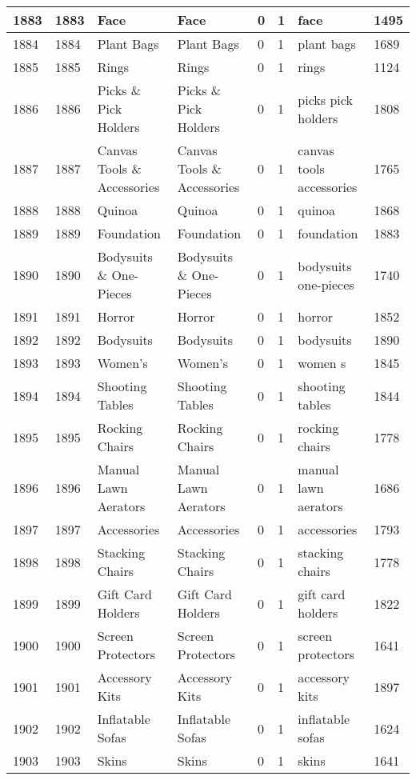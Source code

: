 \begin{longtable}{|l|l|l|l|l|l|l|l|}
1883 & 1883 & Face & Face & 0 & 1 & face & 1495 \\ \hline 
1884 & 1884 & Plant Bags & Plant Bags & 0 & 1 & plant bags & 1689 \\ \hline 
1885 & 1885 & Rings & Rings & 0 & 1 & rings & 1124 \\ \hline 
1886 & 1886 & Picks \& Pick Holders & Picks \& Pick Holders & 0 & 1 & picks pick holders & 1808 \\ \hline 
1887 & 1887 & Canvas Tools \& Accessories & Canvas Tools \& Accessories & 0 & 1 & canvas tools accessories & 1765 \\ \hline 
1888 & 1888 & Quinoa & Quinoa & 0 & 1 & quinoa & 1868 \\ \hline 
1889 & 1889 & Foundation & Foundation & 0 & 1 & foundation & 1883 \\ \hline 
1890 & 1890 & Bodysuits \& One-Pieces & Bodysuits \& One-Pieces & 0 & 1 & bodysuits one-pieces & 1740 \\ \hline 
1891 & 1891 & Horror & Horror & 0 & 1 & horror & 1852 \\ \hline 
1892 & 1892 & Bodysuits & Bodysuits & 0 & 1 & bodysuits & 1890 \\ \hline 
1893 & 1893 & Women's & Women's & 0 & 1 & women s & 1845 \\ \hline 
1894 & 1894 & Shooting Tables & Shooting Tables & 0 & 1 & shooting tables & 1844 \\ \hline 
1895 & 1895 & Rocking Chairs & Rocking Chairs & 0 & 1 & rocking chairs & 1778 \\ \hline 
1896 & 1896 & Manual Lawn Aerators & Manual Lawn Aerators & 0 & 1 & manual lawn aerators & 1686 \\ \hline 
1897 & 1897 & Accessories & Accessories & 0 & 1 & accessories & 1793 \\ \hline 
1898 & 1898 & Stacking Chairs & Stacking Chairs & 0 & 1 & stacking chairs & 1778 \\ \hline 
1899 & 1899 & Gift Card Holders & Gift Card Holders & 0 & 1 & gift card holders & 1822 \\ \hline 
1900 & 1900 & Screen Protectors & Screen Protectors & 0 & 1 & screen protectors & 1641 \\ \hline 
1901 & 1901 & Accessory Kits & Accessory Kits & 0 & 1 & accessory kits & 1897 \\ \hline 
1902 & 1902 & Inflatable Sofas & Inflatable Sofas & 0 & 1 & inflatable sofas & 1624 \\ \hline 
1903 & 1903 & Skins & Skins & 0 & 1 & skins & 1641 \\ \hline 

\end{longtable}
